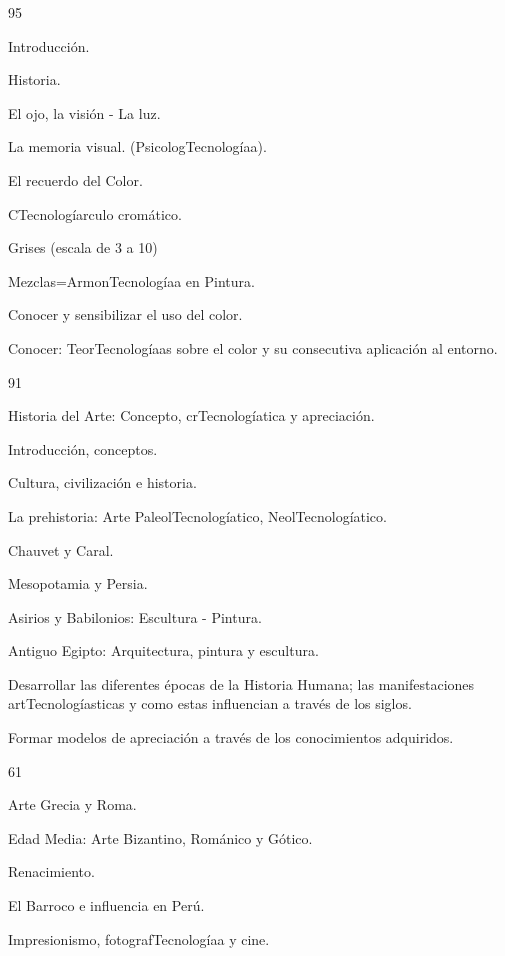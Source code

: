 \begin{syllabus}
\begin{unit}{}{}{9}{5}
\begin{topics}
	\item Introducción.
	\item Historia.
	\item El ojo, la visión - La luz.
	\item La memoria visual. (PsicologTecnologíaa).
	\item El recuerdo del Color.
	\item CTecnologíarculo cromático.
	\item Grises (escala de 3 a 10)
	\item Mezclas=ArmonTecnologíaa en Pintura.
\end{topics}
\begin{unitgoals}
	\item Conocer y sensibilizar el uso del color.
	\item Conocer: TeorTecnologíaas sobre el color y su consecutiva aplicación al entorno.
\end{unitgoals}
\end{unit}

\begin{unit}{}{}{9}{1}
\begin{topics}
	\item Historia del Arte: Concepto, crTecnologíatica y apreciación.
	\item Introducción, conceptos.
	\item Cultura, civilización e historia.
	\item La prehistoria: Arte PaleolTecnologíatico, NeolTecnologíatico.
	\item Chauvet y Caral.
	\item Mesopotamia y Persia.
	\item Asirios y Babilonios: Escultura - Pintura.
	\item Antiguo Egipto: Arquitectura, pintura y escultura.
\end{topics}
\begin{unitgoals}
	\item Desarrollar las diferentes épocas de la Historia Humana; las manifestaciones artTecnologíasticas y como estas influencian a través de los siglos.
	\item Formar modelos de apreciación a través de los conocimientos adquiridos.
\end{unitgoals}
\end{unit}

\begin{unit}{}{}{6}{1}
\begin{topics}
	\item Arte Grecia y Roma.
	\item Edad Media: Arte Bizantino, Románico y Gótico.
	\item Renacimiento.
	\item El Barroco e influencia en Perú.
	\item Impresionismo, fotografTecnologíaa y cine.
\end{topics}


\end{unit}
\end{syllabus}
